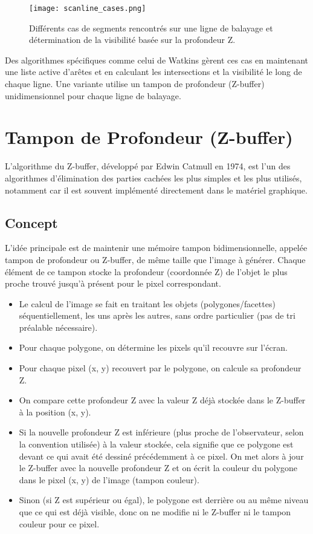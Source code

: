 \documentclass{article}
\begin{document}
\begin{figure}[H]
\centering
\texttt{[image: scanline\_cases.png]}
\caption{Différents cas de segments rencontrés sur une ligne de balayage et détermination de la visibilité basée sur la profondeur Z.}
\label{fig:scanline_cases}
\end{figure}

Des algorithmes spécifiques comme celui de Watkins gèrent ces cas en maintenant une liste active d'arêtes et en calculant les intersections et la visibilité le long de chaque ligne. Une variante utilise un tampon de profondeur (Z-buffer) unidimensionnel pour chaque ligne de balayage.

\section{Tampon de Profondeur (Z-buffer)}

L'algorithme du Z-buffer, développé par Edwin Catmull en 1974, est l'un des algorithmes d'élimination des parties cachées les plus simples et les plus utilisés, notamment car il est souvent implémenté directement dans le matériel graphique.

\subsection{Concept}

L'idée principale est de maintenir une mémoire tampon bidimensionnelle, appelée tampon de profondeur ou Z-buffer, de même taille que l'image à générer. Chaque élément de ce tampon stocke la profondeur (coordonnée Z) de l'objet le plus proche trouvé jusqu'à présent pour le pixel correspondant.

\begin{itemize}
    \item Le calcul de l'image se fait en traitant les objets (polygones/facettes) séquentiellement, les uns après les autres, sans ordre particulier (pas de tri préalable nécessaire).
    \item Pour chaque polygone, on détermine les pixels qu'il recouvre sur l'écran.
    \item Pour chaque pixel (x, y) recouvert par le polygone, on calcule sa profondeur Z.
    \item On compare cette profondeur Z avec la valeur Z déjà stockée dans le Z-buffer à la position (x, y).
    \item Si la nouvelle profondeur Z est inférieure (plus proche de l'observateur, selon la convention utilisée) à la valeur stockée, cela signifie que ce polygone est devant ce qui avait été dessiné précédemment à ce pixel. On met alors à jour le Z-buffer avec la nouvelle profondeur Z et on écrit la couleur du polygone dans le pixel (x, y) de l'image (tampon couleur).
    \item Sinon (si Z est supérieur ou égal), le polygone est derrière ou au même niveau que ce qui est déjà visible, donc on ne modifie ni le Z-buffer ni le tampon couleur pour ce pixel.
\end{itemize}
\end{document}
